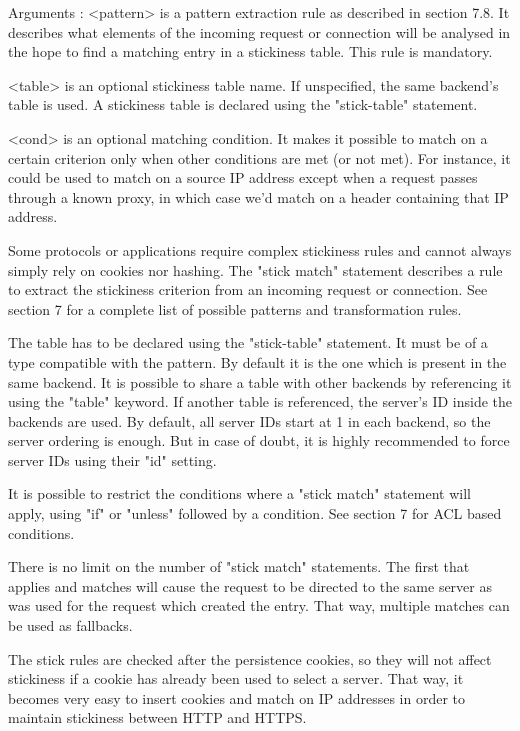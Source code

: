   Arguments :
    <pattern>  is a pattern extraction rule as described in section 7.8. It
               describes what elements of the incoming request or connection
               will be analysed in the hope to find a matching entry in a
               stickiness table. This rule is mandatory.

    <table>    is an optional stickiness table name. If unspecified, the same
               backend's table is used. A stickiness table is declared using
               the "stick-table" statement.

    <cond>     is an optional matching condition. It makes it possible to match
               on a certain criterion only when other conditions are met (or
               not met). For instance, it could be used to match on a source IP
               address except when a request passes through a known proxy, in
               which case we'd match on a header containing that IP address.

  Some protocols or applications require complex stickiness rules and cannot
  always simply rely on cookies nor hashing. The "stick match" statement
  describes a rule to extract the stickiness criterion from an incoming request
  or connection. See section 7 for a complete list of possible patterns and
  transformation rules.

  The table has to be declared using the "stick-table" statement. It must be of
  a type compatible with the pattern. By default it is the one which is present
  in the same backend. It is possible to share a table with other backends by
  referencing it using the "table" keyword. If another table is referenced,
  the server's ID inside the backends are used. By default, all server IDs
  start at 1 in each backend, so the server ordering is enough. But in case of
  doubt, it is highly recommended to force server IDs using their "id" setting.

  It is possible to restrict the conditions where a "stick match" statement
  will apply, using "if" or "unless" followed by a condition. See section 7 for
  ACL based conditions.

  There is no limit on the number of "stick match" statements. The first that
  applies and matches will cause the request to be directed to the same server
  as was used for the request which created the entry. That way, multiple
  matches can be used as fallbacks.

  The stick rules are checked after the persistence cookies, so they will not
  affect stickiness if a cookie has already been used to select a server. That
  way, it becomes very easy to insert cookies and match on IP addresses in
  order to maintain stickiness between HTTP and HTTPS.

